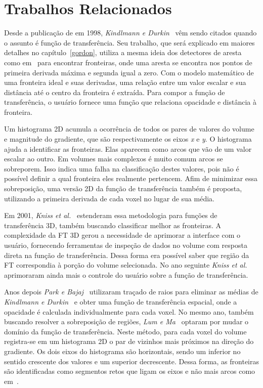 
\chapter{Trabalhos Relacionados}
\label{related}
	Desde a publicação de  em 1998, \textit{Kindlmann e Durkin}~\cite{gordon} vêm sendo citados quando o assunto é função de transferência. Seu trabalho, que será explicado em maiores detalhes no capítulo~\ref{gordon}, utiliza a mesma ideia dos detectores de aresta como em~\cite{canny} para encontrar fronteiras, onde uma aresta se encontra nos pontos de primeira derivada máxima e segunda igual a zero. Com o modelo matemático de uma fronteira ideal e suas derivadas, uma relação entre um valor escalar e sua distância até o centro da fronteira é extraída. Para compor a função de transferência, o usuário fornece uma função que relaciona opacidade e distância à fronteira. 
	
	Um histograma 2D acumula a ocorrência de todos os pares de valores do volume e magnitude do gradiente, que são respectivamente os eixos \textit{x} e \textit{y}. O histograma ajuda a identificar as fronteiras. Elas aparecem como arcos que vão de um valor escalar ao outro. Em volumes mais complexos é muito comum arcos se sobreporem. Isso indica uma falha na classificação destes valores, pois não é possível definir a qual fronteira eles realmente pertencem. Afim de minimizar essa sobreposição, uma versão 2D da função de transferência também é proposta, utilizando a primeira derivada de cada voxel no lugar de sua média.
	
	Em 2001, \textit{Kniss et al.}~\cite{kniss1} estenderam essa metodologia para funções de transferência 3D, também buscando classificar melhor as fronteiras. A complexidade da FT 3D gerou a necessidade de aprimorar a interface com o usuário, fornecendo ferramentas de inspeção de dados no volume com resposta direta na função de transferência. Dessa forma era possível saber que região da FT correspondia à porção do volume selecionada. No ano seguinte \textit{Kniss et al.}~\cite{kniss2} aprimoraram ainda mais o controle do usuário sobre a função de transferência.
	
	Anos depois \textit{Park e Bajaj}~\cite{park} utilizaram traçado de raios para eliminar as médias de \textit{Kindlmann e Durkin}~\cite{gordon} e obter uma função de transferência espacial, onde a opacidade é calculada individualmente para cada voxel. No mesmo ano, também buscando resolver a sobreposição de regiões, \textit{Lum e Ma}~\cite{lumema} optaram por mudar o domínio da função de transferência. Neste método, para cada voxel do volume registra-se em um histograma 2D o par de vizinhos mais próximos na direção do gradiente. Os dois eixos do histograma são horizontais, sendo um inferior no sentido crescente dos valores e um superior decrescente. Dessa forma, as fronteiras são identificadas como segmentos retos que ligam os eixos e não mais arcos como em~\cite{gordon}.
	
